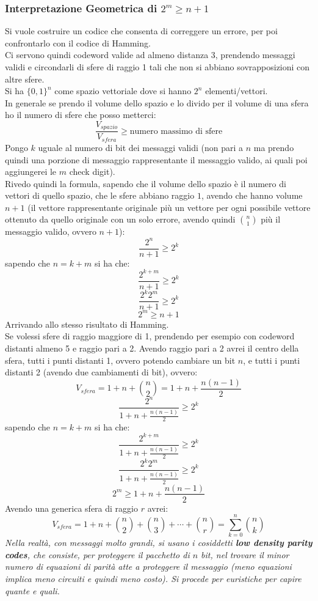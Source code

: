 \documentclass[a4paper,12pt, oneside]{book}
\begin{document}
\subsubsection{Interpretazione Geometrica di $2^m\geq n+1$}
Si vuole costruire un codice che consenta di correggere un errore, per poi
confrontarlo con il codice di Hamming.\\
Ci servono quindi codeword valide ad almeno distanza 3, prendendo messaggi
validi e circondarli di sfere di raggio 1 tali che non si abbiano
sovrapposizioni con altre sfere.\\
Si ha $\{0,1\}^n$ come spazio vettoriale dove si hanno $2^n$
elementi/vettori. \\
In generale se prendo il volume dello spazio e lo divido per il volume di una
sfera ho il numero di sfere che posso metterci:
\[\frac{V_{spazio}}{V_{sfera}}\geq \mbox{numero massimo di sfere}\]
Pongo $k$ uguale al numero di bit dei messaggi validi (non pari a $n$ ma
prendo quindi una porzione di messaggio rappresentante il messaggio valido, ai
quali poi aggiungerei le $m$ check digit).\\
Rivedo quindi la formula, sapendo che il volume dello spazio è il numero di
vettori di quello spazio, che le sfere abbiano raggio $1$, avendo che hanno
volume $n+1$ (il vettore rappresentante originale più un vettore per ogni
possibile vettore ottenuto da quello originale con un solo errore, avendo
quindi ${{n}\choose{1}}$ più il messaggio valido, ovvero $n+1$): 
\[\frac{2^n}{n+1}\geq 2^k\]
sapendo che $n=k+m$ si ha che:
\[\frac{2^{k+m}}{n+1}\geq 2^k\]
\[\frac{2^{k}2^m}{n+1}\geq 2^k\]
\[2^m\geq n+1\]
Arrivando allo stesso risultato di Hamming.\\
Se volessi sfere di raggio maggiore di 1, prendendo per esempio con codeword
distanti almeno 5 e raggio pari a 2. Avendo raggio pari a 2 avrei il centro
della sfera, tutti i punti distanti 1, ovvero potendo cambiare un bit $n$, e
tutti i punti distanti 2 (avendo due 
cambiamenti di bit), ovvero:
\[V_{sfera}=1+n+{{n}\choose{2}}=1+n+\frac{n(n-1)}{2}\]
\[\frac{2^n}{1+n+\frac{n(n-1)}{2}}\geq 2^k\]
sapendo che $n=k+m$ si ha che:
\[\frac{2^{k+m}}{1+n+\frac{n(n-1)}{2}}\geq 2^k\]
\[\frac{2^{k}2^m}{1+n+\frac{n(n-1)}{2}}\geq 2^k\]
\[2^m\geq 1+n+\frac{n(n-1)}{2}\]
Avendo una generica sfera di raggio $r$ avrei:
\[V_{sfera}=1+n+{{n}\choose{2}}+{{n}\choose{3}}+\cdots+{{n}\choose{r}}=
  \sum_{k=0}^n{{n}\choose{k}}\] 
\textit{Nella realtà, con messaggi molto grandi, si usano i cosiddetti
  \textbf{low density parity codes}, che consiste, per proteggere il pacchetto
  di $n$ bit, nel trovare il minor numero di equazioni di parità atte a
  proteggere il messaggio (meno equazioni implica meno circuiti e quindi meno
  costo). Si procede per euristiche per capire quante e quali.}
\end{document}
